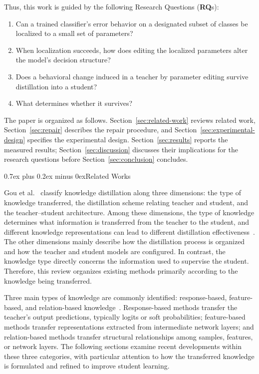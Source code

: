 \documentclass[10pt,journal,compsoc]{IEEEtran}
\makeatletter
\def\section{\@startsection{section}{1}{\z@}{-3.5ex plus -0.5ex minus -1.5ex}%
{0.7ex plus 0.2ex minus 0ex}{\normalfont\sublargesize\sffamily\bfseries\scshape}}
\theoremstyle{definition}
\makeatother
\begin{document}
Thus, this work is guided by the following Research Questions (\textbf{RQ}s):
\begin{enumerate}
  \renewcommand{\labelenumi}{\textbf{RQ\arabic{enumi}:}}
  \item Can a trained classifier's error behavior on a designated subset of
  classes be localized to a small set of parameters?
  \item When localization succeeds, how does editing the localized parameters
  alter the model's decision structure?
  \item Does a behavioral change induced in a teacher by parameter editing
  survive distillation into a student?
  \item What determines whether it survives?
\end{enumerate}

The paper is organized as follows.
Section~\ref{sec:related-work} reviews related work,
Section~\ref{sec:repair} describes the repair procedure, and
Section~\ref{sec:experimental-design} specifies the experimental
design. Section~\ref{sec:results} reports the measured results;
Section~\ref{sec:discussion} discusses their implications for the
research questions before Section~\ref{sec:conclusion} concludes.

\vspace{-5pt}
\section{Related Works}
\label{sec:related-work}

Gou et al.~\cite{gou2021knowledge} classify knowledge distillation along three dimensions: the type of knowledge transferred, the distillation scheme relating teacher and student, and the teacher--student architecture. Among these dimensions, the type of knowledge determines what information is transferred from the teacher to the student, and different knowledge representations can lead to different distillation effectiveness~\cite{gou2021knowledge}. The other dimensions mainly describe how the distillation process is organized and how the teacher and student models are configured. In contrast, the knowledge type directly concerns the information used to supervise the student. Therefore, this review organizes existing methods primarily according to the knowledge being transferred.

Three main types of knowledge are commonly identified: response-based, feature-based, and relation-based knowledge~\cite{gou2021knowledge}. Response-based methods transfer the teacher's output predictions, typically logits or soft probabilities; feature-based methods transfer representations extracted from intermediate network layers; and relation-based methods transfer structural relationships among samples, features, or network layers. The following sections examine recent developments within these three categories, with particular attention to how the transferred knowledge is formulated and refined to improve student learning.
\end{document}
